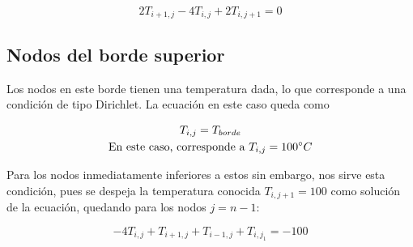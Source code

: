 \documentclass[12pt, notitlepage]{article}
\begin{document}
\begin{equation*}
2T_{i+1,j} - 4T_{i,j} + 2T_{i,j+1} = 0
\end{equation*}

\subsection{Nodos del borde superior}
Los nodos en este borde tienen una temperatura dada, lo que corresponde a una condición de tipo Dirichlet. La ecuación en este caso queda como

\begin{gather*}
T_{i,j} = T_{borde}\\
\text{En este caso, corresponde a}\ T_{i,j} = 100\degree C
\end{gather*}

Para los nodos inmediatamente inferiores a estos sin embargo, nos sirve esta condición, pues se despeja la temperatura conocida $T_{i,j+1} = 100$ como solución de la ecuación, quedando para los nodos $j=n-1$:

\begin{equation*}
-4T_{i,j} + T_{i+1,j} + T_{i-1,j} + T_{i,j_1} = -100
\end{equation*}
\end{document}
